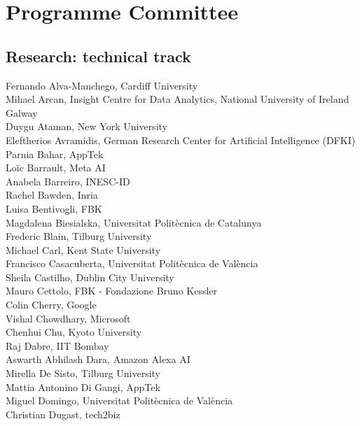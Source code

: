 \documentclass[a4paper,11pt,twoside]{book}
\begin{document}
\pagebreak

\section*{Programme Committee}
\subsection*{Research: technical track}
\noindent Fernando Alva-Manchego, Cardiff University\\
\noindent Mihael Arcan, Insight Centre for Data Analytics, National University of Ireland Galway\\
\noindent Duygu Ataman, New York University\\
\noindent Eleftherios Avramidis, German Research Center for Artificial Intelligence (DFKI)\\
\noindent Parnia Bahar, AppTek\\
\noindent Loïc Barrault, Meta AI\\
\noindent Anabela Barreiro, INESC-ID\\
\noindent Rachel Bawden, Inria\\
\noindent Luisa Bentivogli, FBK\\
\noindent Magdalena Biesialska, Universitat Politècnica de Catalunya\\
\noindent Frederic Blain, Tilburg University\\
\noindent Michael Carl, Kent State University\\
\noindent Francisco Casacuberta, Universitat Politècnica de València\\
\noindent Sheila Castilho, Dublin City University\\
\noindent Mauro Cettolo, FBK - Fondazione Bruno Kessler\\
\noindent Colin Cherry, Google\\
\noindent Vishal Chowdhary, Microsoft\\
\noindent Chenhui Chu, Kyoto University\\
\noindent Raj Dabre, IIT Bombay\\
\noindent Aswarth Abhilash Dara, Amazon Alexa AI\\
\noindent Mirella De Sisto, Tilburg University\\
\noindent Mattia Antonino Di Gangi, AppTek\\
\noindent Miguel Domingo, Universitat Politècnica de València\\
\noindent Christian Dugast, tech2biz\\
\end{document}
